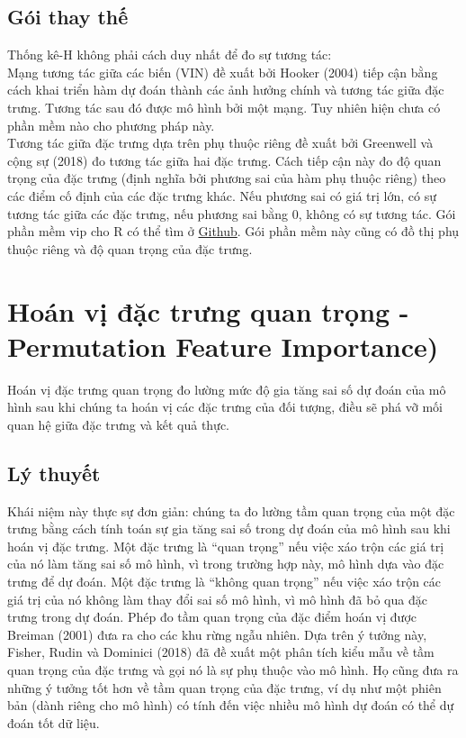 \subsection{Gói thay thế}
Thống kê-H không phải cách duy nhất để đo sự tương tác:\\
Mạng tương tác giữa các biến (VIN) đề xuất bởi Hooker (2004) tiếp cận bằng cách khai triển hàm dự đoán thành các ảnh hưởng chính và tương tác giữa đặc trưng. Tương tác sau đó được mô hình bởi một mạng. Tuy nhiên hiện chưa có phần mềm nào cho phương pháp này.\\
Tương tác giữa đặc trưng dựa trên phụ thuộc riêng đề xuất bởi Greenwell và cộng sự (2018) đo tương tác giữa hai đặc trưng. Cách tiếp cận này đo độ quan trọng của đặc trưng (định nghĩa bởi phương sai của hàm phụ thuộc riêng) theo các điểm cố định của các đặc trưng khác. Nếu phương sai có giá trị lớn, có sự tương tác giữa các đặc trưng, nếu phương sai bằng 0, không có sự tương tác. Gói phần mềm vip cho R có thể tìm ở \href{https://github.com/koalaverse/vip}{Github}. Gói phần mềm này cũng có đồ thị phụ thuộc riêng và độ quan trọng của đặc trưng.

\clearpage
\section{Hoán vị đặc trưng quan trọng - Permutation Feature Importance)}
Hoán vị đặc trưng quan trọng đo lường mức độ gia tăng sai số dự đoán của mô hình sau khi chúng ta hoán vị các đặc trưng của đối tượng, điều sẽ phá vỡ mối quan hệ giữa đặc trưng và kết quả thực.

\subsection{Lý thuyết}

Khái niệm này thực sự đơn giản: chúng ta đo lường tầm quan trọng của một đặc trưng bằng cách tính toán sự gia tăng sai số trong dự đoán của mô hình sau khi hoán vị đặc trưng. Một đặc trưng là ``quan trọng'' nếu việc xáo trộn các giá trị của nó làm tăng sai số mô hình, vì trong trường hợp này, mô hình dựa vào đặc trưng để dự đoán. Một đặc trưng là ``không quan trọng'' nếu việc xáo trộn các giá trị của nó không làm thay đổi sai số mô hình, vì mô hình đã bỏ qua đặc trưng trong dự đoán. Phép đo tầm quan trọng của đặc điểm hoán vị được Breiman (2001) đưa ra cho các khu rừng ngẫu nhiên. Dựa trên ý tưởng này, Fisher, Rudin và Dominici (2018) đã đề xuất một phân tích kiểu mẫu về tầm quan trọng của đặc trưng và gọi nó là sự phụ thuộc vào mô hình. Họ cũng đưa ra những ý tưởng tốt hơn về tầm quan trọng của đặc trưng, ví dụ như một phiên bản (dành riêng cho mô hình) có tính đến việc nhiều mô hình dự đoán có thể dự đoán tốt dữ liệu. 

